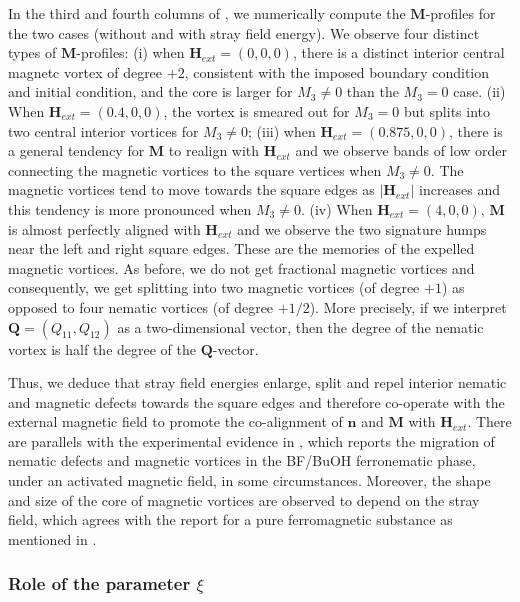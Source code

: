 \documentclass{article}
\def\Qvec{\mathbf{Q}}
\def \Mvec{\mathbf{M}}
\def\nvec{\mathbf{n}}
\def\Hvec{\mathbf{H}}
\begin{document}
In the third and fourth columns of , we numerically compute the $\Mvec$-profiles for the two cases (without and with stray field energy). We observe four distinct types of $\Mvec$-profiles: (i) when $\Hvec_{ext} = \left(0, 0, 0\right)$, there is a distinct interior central magnetc vortex of degree $+2$, consistent with the imposed boundary condition and initial condition, and the core is larger for $M_3 \neq 0$ than the $M_3=0$ case. (ii) When $\Hvec_{ext} = \left(0.4, 0, 0\right)$, the vortex is smeared out for $M_3=0$ but splits into two central interior vortices for $M_3 \neq 0$; (iii) when $\Hvec_{ext} = \left(0.875, 0, 0\right)$, there is a general tendency for $\Mvec$ to realign with $\Hvec_{ext}$ and we observe bands of low order connecting the magnetic vortices to the square vertices when $M_3 \neq 0$. The magnetic vortices tend to move towards the square edges as $|\Hvec_{ext}|$ increases and this tendency is more pronounced when $M_3 \neq 0$. (iv) When $\Hvec_{ext} = \left(4, 0, 0\right)$, $\Mvec$ is almost perfectly aligned with $\Hvec_{ext}$ and we observe the two signature humps near the left and right square edges. These are the memories of the expelled magnetic vortices. As before, we do not get fractional magnetic vortices and consequently, we get splitting into two magnetic vortices (of degree $+1$) as opposed to four nematic vortices (of degree $+1/2$). More precisely, if we interpret $\Qvec=(Q_{11}, Q_{12})$ as a two-dimensional vector, then the degree of the nematic vortex is half the degree of the $\Qvec$-vector.

Thus, we deduce that stray field energies enlarge, split and repel interior nematic and magnetic defects towards the square edges and therefore co-operate with the external magnetic field to promote the co-alignment of $\nvec$ and $\Mvec$ with $\Hvec_{ext}$. There are parallels with the experimental evidence in \cite{Shui}, which reports the migration of nematic defects and magnetic vortices in the BF/BuOH ferronematic phase, under an activated magnetic field, in some circumstances. Moreover, the shape and size of the core of magnetic vortices are observed to depend on the stray field, which agrees with the report  for a pure ferromagnetic substance as mentioned in \cite{wachowiak2002direct}. 

\subsubsection{Role of the parameter \texorpdfstring{$\xi$}{xi}}\label{role of parameter chi}
\end{document}
